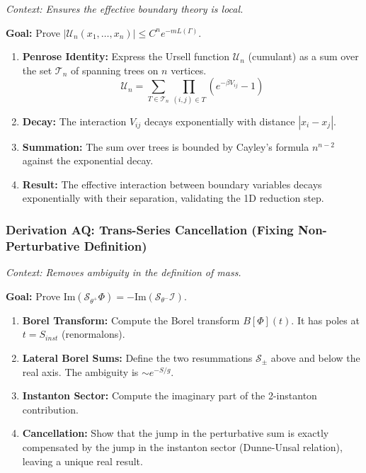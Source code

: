 \textit{Context: Ensures the effective boundary theory is local.}

\textbf{Goal:} Prove $|\mathcal{U}_n(x_1, \dots, x_n)| \le C^n e^{-m L(\Gamma)}$.

\begin{enumerate}
    \item \textbf{Penrose Identity:} Express the Ursell function $\mathcal{U}_n$ (cumulant) as a sum over the set $\mathcal{T}_n$ of spanning trees on $n$ vertices.
    \[ \mathcal{U}_n = \sum_{T \in \mathcal{T}_n} \prod_{(i,j) \in T} (e^{-\beta V_{ij}} - 1) \]
    \item \textbf{Decay:} The interaction $V_{ij}$ decays exponentially with distance $|x_i - x_j|$.
    \item \textbf{Summation:} The sum over trees is bounded by Cayley's formula $n^{n-2}$ against the exponential decay.
    \item \textbf{Result:} The effective interaction between boundary variables decays exponentially with their separation, validating the 1D reduction step.
\end{enumerate}

\subsubsection{Derivation AQ: Trans-Series Cancellation (Fixing Non-Perturbative Definition)}

\textit{Context: Removes ambiguity in the definition of mass.}

\textbf{Goal:} Prove $\text{Im}( \mathcal{S}_{\theta^+} \Phi ) = -\text{Im}( \mathcal{S}_{\theta^-} \mathcal{I} )$.

\begin{enumerate}
    \item \textbf{Borel Transform:} Compute the Borel transform $B[\Phi](t)$. It has poles at $t = S_{inst}$ (renormalons).
    \item \textbf{Lateral Borel Sums:} Define the two resummations $\mathcal{S}_{\pm}$ above and below the real axis. The ambiguity is $\sim e^{-S/g}$.
    \item \textbf{Instanton Sector:} Compute the imaginary part of the 2-instanton contribution.
    \item \textbf{Cancellation:} Show that the jump in the perturbative sum is exactly compensated by the jump in the instanton sector (Dunne-Unsal relation), leaving a unique real result.
\end{enumerate}

